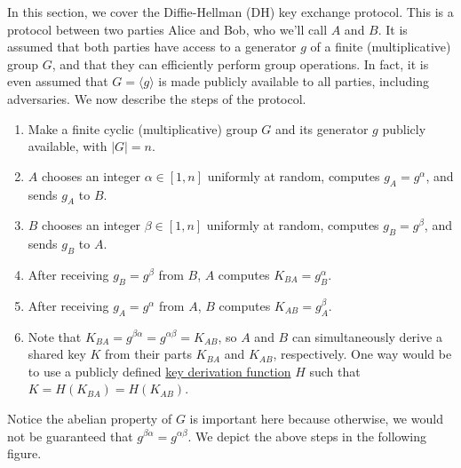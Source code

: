 In this section, we cover the Diffie-Hellman (DH) key exchange protocol. 
This is a protocol between two parties Alice and Bob, who we'll call $A$ and $B$. 
It is assumed that both parties have access to a generator $g$ of a finite 
(multiplicative) group $G$, and that they can efficiently perform group operations. 
In fact, it is even assumed that $G = \langle g \rangle$ is made publicly 
available to all parties, including adversaries. We now describe the steps of 
the protocol. 

\begin{enumerate}
    \item Make a finite cyclic (multiplicative) group $G$ and its generator $g$ 
          publicly available, with $|G| = n$. 
    \item $A$ chooses an integer $\alpha \in [1, n]$ uniformly at random, computes 
          $g_A = g^\alpha$, and sends $g_A$ to $B$. 
    \item $B$ chooses an integer $\beta \in [1, n]$ uniformly at random, computes 
          $g_B = g^\beta$, and sends $g_B$ to $A$. 
    \item After receiving $g_B = g^\beta$ from $B$, $A$ computes $K_{BA} = g_B^\alpha$. 
    \item After receiving $g_A = g^\alpha$ from $A$, $B$ computes $K_{AB} = g_A^\beta$. 
    \item Note that $K_{BA} = g^{\beta\alpha} = g^{\alpha\beta} = K_{AB}$, so $A$ and 
          $B$ can simultaneously derive a shared key $K$ from their parts $K_{BA}$
          and $K_{AB}$, respectively. One way would be to use a publicly defined
          \href{https://en.wikipedia.org/wiki/Key_derivation_function}{key 
          derivation function} $H$ such that $K = H(K_{BA}) = H(K_{AB})$. 
\end{enumerate}

Notice the abelian property of $G$ is important here because otherwise, we would 
not be guaranteed that $g^{\beta\alpha} = g^{\alpha\beta}$. 
We depict the above steps in the following figure. 

\begin{center}
\end{center}

